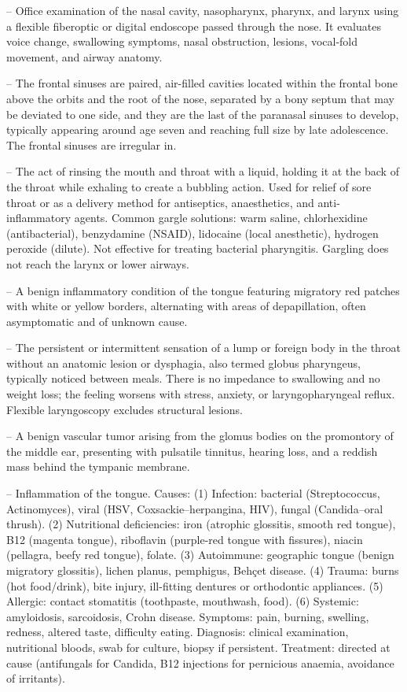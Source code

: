 -- Office examination of the nasal cavity, nasopharynx, pharynx, and larynx using a flexible fiberoptic or digital endoscope passed through the nose. It evaluates voice change, swallowing symptoms, nasal obstruction, lesions, vocal-fold movement, and airway anatomy.

-- The frontal sinuses are paired, air-filled cavities located within the frontal bone above the orbits and the root of the nose, separated by a bony septum that may be deviated to one side, and they are the last of the paranasal sinuses to develop, typically appearing around age seven and reaching full size by late adolescence. The frontal sinuses are irregular in.

-- The act of rinsing the mouth and throat with a liquid, holding it at the back of the throat while exhaling to create a bubbling action. Used for relief of sore throat or as a delivery method for antiseptics, anaesthetics, and anti-inflammatory agents. Common gargle solutions: warm saline, chlorhexidine (antibacterial), benzydamine (NSAID), lidocaine (local anesthetic), hydrogen peroxide (dilute). Not effective for treating bacterial pharyngitis. Gargling does not reach the larynx or lower airways.

-- A benign inflammatory condition of the tongue featuring migratory red patches with white or yellow borders, alternating with areas of depapillation, often asymptomatic and of unknown cause.

-- The persistent or intermittent sensation of a lump or foreign body in the throat without an anatomic lesion or dysphagia, also termed globus pharyngeus, typically noticed between meals. There is no impedance to swallowing and no weight loss; the feeling worsens with stress, anxiety, or laryngopharyngeal reflux. Flexible laryngoscopy excludes structural lesions.

-- A benign vascular tumor arising from the glomus bodies on the promontory of the middle ear, presenting with pulsatile tinnitus, hearing loss, and a reddish mass behind the tympanic membrane.

-- Inflammation of the tongue. Causes: (1) Infection: bacterial (Streptococcus, Actinomyces), viral (HSV, Coxsackie--herpangina, HIV), fungal (Candida--oral thrush). (2) Nutritional deficiencies: iron (atrophic glossitis, smooth red tongue), B12 (magenta tongue), riboflavin (purple-red tongue with fissures), niacin (pellagra, beefy red tongue), folate. (3) Autoimmune: geographic tongue (benign migratory glossitis), lichen planus, pemphigus, Behçet disease. (4) Trauma: burns (hot food/drink), bite injury, ill-fitting dentures or orthodontic appliances. (5) Allergic: contact stomatitis (toothpaste, mouthwash, food). (6) Systemic: amyloidosis, sarcoidosis, Crohn disease. Symptoms: pain, burning, swelling, redness, altered taste, difficulty eating. Diagnosis: clinical examination, nutritional bloods, swab for culture, biopsy if persistent. Treatment: directed at cause (antifungals for Candida, B12 injections for pernicious anaemia, avoidance of irritants).

